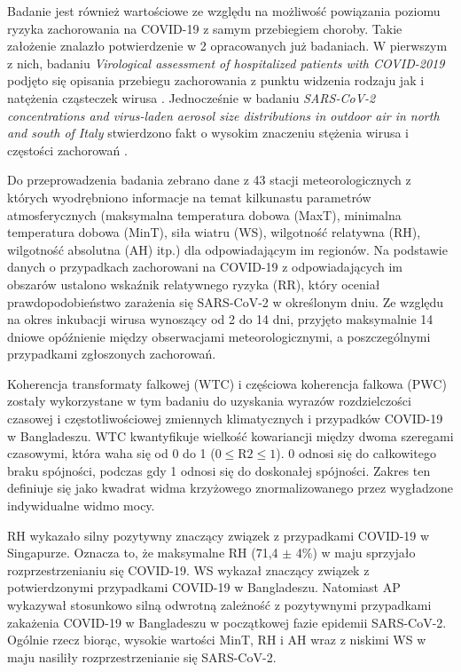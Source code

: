 \documentclass[polish, twoside, 12pt, a4paper]{article}
\theoremstyle{definition}
\theoremstyle{plain}
\theoremstyle{remark}
\begin{document}
Badanie jest również wartościowe ze względu na możliwość powiązania poziomu ryzyka zachorowania na COVID-19 z samym przebiegiem choroby. Takie założenie znalazło potwierdzenie w 2 opracowanych już badaniach. W pierwszym z nich,  badaniu \emph{Virological assessment of hospitalized patients with COVID-2019} podjęto się opisania przebiegu zachorowania z punktu widzenia rodzaju jak i natężenia cząsteczek wirusa \cite{wolfel2020}. Jednocześnie w badaniu \emph{SARS-CoV-2 concentrations and virus-laden aerosol size distributions in outdoor air in north and south of Italy} stwierdzono fakt o wysokim znaczeniu stężenia wirusa i częstości zachorowań \cite{chirizzi2020}.

Do przeprowadzenia badania zebrano dane z 43 stacji meteorologicznych z których wyodrębniono informacje na temat kilkunastu parametrów atmosferycznych (maksymalna temperatura dobowa (MaxT), minimalna temperatura dobowa (MinT), siła wiatru (WS), wilgotność relatywna (RH), wilgotność absolutna (AH) itp.) dla odpowiadającym im regionów. Na podstawie danych o przypadkach zachorowani na COVID-19 z odpowiadających im obszarów ustalono wskaźnik relatywnego ryzyka (RR), który oceniał prawdopodobieństwo zarażenia się SARS-CoV-2 w określonym dniu. Ze względu na okres inkubacji wirusa wynoszący od 2 do 14 dni, przyjęto maksymalnie 14 dniowe opóźnienie między obserwacjami meteorologicznymi, a poszczególnymi przypadkami zgłoszonych zachorowań.

Koherencja transformaty falkowej (WTC) i częściowa koherencja falkowa (PWC) zostały wykorzystane w tym badaniu do uzyskania wyrazów rozdzielczości czasowej i częstotliwościowej zmiennych klimatycznych i przypadków COVID-19 w Bangladeszu. WTC kwantyfikuje wielkość kowariancji między dwoma szeregami czasowymi, która waha się od 0 do 1 ($0 \leq \text{R2} \leq 1$). 0 odnosi się do całkowitego braku spójności, podczas gdy 1 odnosi się do doskonałej spójności. Zakres ten definiuje się jako kwadrat widma krzyżowego znormalizowanego przez wygładzone indywidualne widmo mocy. 

RH wykazało silny pozytywny znaczący związek z przypadkami COVID-19 w Singapurze. Oznacza to, że maksymalne RH (71,4 $\pm$ 4\%) w maju sprzyjało rozprzestrzenianiu się COVID-19. WS wykazał znaczący związek z potwierdzonymi przypadkami COVID-19 w Bangladeszu. Natomiast AP wykazywał stosunkowo silną odwrotną zależność z pozytywnymi przypadkami zakażenia COVID-19 w Bangladeszu w początkowej fazie epidemii SARS-CoV-2. Ogólnie rzecz biorąc, wysokie wartości MinT, RH i AH wraz z niskimi WS w maju nasiliły rozprzestrzenianie się SARS-CoV-2.
\end{document}
